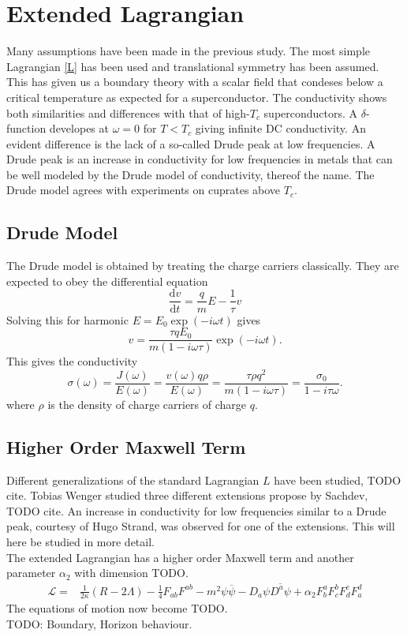 \documentclass[12pt]{report}
\renewcommand{\d}{\ensuremath{\mathrm{d}}}
\renewcommand{\i}{\ensuremath{i}}
\begin{document}
\chapter{Extended Lagrangian\label{higherOrder}}
Many assumptions have been made in the previous study. The most simple Lagrangian \eqref{L} has been used and translational symmetry has been assumed. This has given us a boundary theory with a scalar field that condeses below a critical temperature as expected for a superconductor. The conductivity shows both similarities and differences with that of high-$T_c$ superconductors. A $\delta$-function developes at $\omega=0$ for $T<T_c$ giving infinite DC conductivity. An evident difference is the lack of a so-called Drude peak at low frequencies. A Drude peak is an increase in conductivity for low frequencies in metals that can be well modeled by the Drude model of conductivity\cite{drude}, thereof the name. The Drude model agrees with experiments on cuprates above $T_c$\cite{drudeFit}.

\section{Drude Model}
The Drude model is obtained by treating the charge carriers classically. They are expected to obey the differential equation
\begin{equation}
 \frac{\d v}{\d t}=\frac{q}{m}E-\frac{1}{\tau}v
\end{equation}
Solving this for harmonic $E=E_0\exp(-\i\omega t)$ gives 
\begin{equation}
 v=\frac{\tau qE_0}{m(1-\i\omega\tau)}\exp(-\i\omega t).
\end{equation}
This gives the conductivity
\begin{equation}
 \sigma(\omega)=\frac{J(\omega)}{E(\omega)}=\frac{v(\omega)q\rho}{E(\omega)}=\frac{\tau\rho q^2}{m(1-\i\omega\tau)}=\frac{\sigma_0}{1-\i\tau\omega}.
\end{equation}
where $\rho$ is the density of charge carriers of charge $q$.
\section{Higher Order Maxwell Term}
Different generalizations of the standard Lagrangian $L$ have been studied, TODO cite. Tobias Wenger studied three different extensions propose by Sachdev, TODO cite. An increase in conductivity for low frequencies similar to a Drude peak, courtesy of Hugo Strand, was observed for one of the extensions. This will here be studied in more detail.\\
The extended Lagrangian has a higher order Maxwell term and another parameter $\alpha_2$ with dimension TODO.
\begin{eqnarray}
 \mathcal{L}=&\frac{1}{2\kappa}\left(R-2\Lambda\right)-\frac{1}{4}F_{ab}F^{ab}-m^2\psi\overline{\psi}-D_a\psi\overline{D^a\psi}
+\alpha_2F^a_bF^b_cF^c_dF^d_a\label{L2}
\end{eqnarray}
The equations of motion now become TODO.\\
TODO: Boundary, Horizon behaviour.\\
\end{document}
